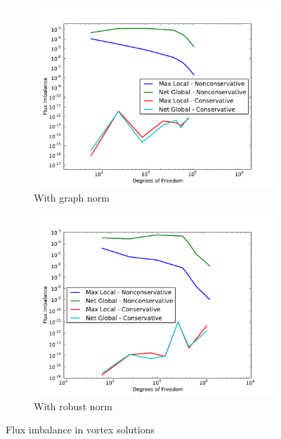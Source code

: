 \documentclass[letterpaper]{article}
\begin{document}
\begin{figure}
\centering
\begin{subfigure}[t]{0.45\textwidth}
\centering
\includegraphics[width=\textwidth]{figs/Vortex/graphFlux.pdf}
\caption{With graph norm}
\label{fig:vortexGraphFlux}
\end{subfigure}
\begin{subfigure}[t]{0.45\textwidth}
\centering
\includegraphics[width=\textwidth]{figs/Vortex/robustFlux.pdf}
\caption{With robust norm}
\label{fig:vortexRobustFlux}
\end{subfigure}
\caption{Flux imbalance in vortex solutions}
\label{fig:vortex_flux}
\end{figure}
\end{document}

